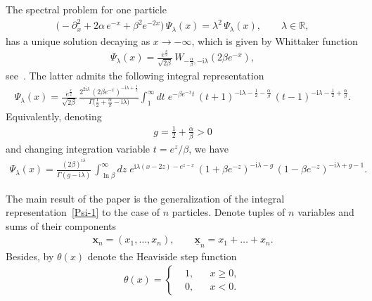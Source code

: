 \documentclass[11pt]{article}
\numberwithin{equation}{section}
\theoremstyle{plain}
\theoremstyle{definition}
\renewcommand{\imath}{\mathrm{i}}
\begin{document}
The spectral problem for one particle
\begin{align}
	\bigl( - \partial_{x}^2 + 2\alpha \, e^{-x} + \beta^2 e^{-2x} \bigr) \, \Psi_{\lambda}(x) = \lambda^2 \, \Psi_{\lambda}(x), \qquad \lambda \in \mathbb{R},
\end{align}
has a unique solution decaying as $x \to -\infty$, which is given by Whittaker function
\begin{align} \label{Psi-W}
	\Psi_{\lambda}(x) = \frac{e^{\frac{x}{2}}}{\sqrt{2\beta}} \, W_{- \frac{\alpha}{\beta}, - \imath \lambda}(2\beta e^{-x}),
\end{align}
see~\cite[\href{https://dlmf.nist.gov/13}{Chapter 13}]{DLMF}. The latter admits the following integral representation~\cite[\href{http://dlmf.nist.gov/13.16.E5}{(13.16.5)}]{DLMF}
\begin{align}
	\Psi_{\lambda}(x) = \frac{e^{\frac{x}{2}}}{\sqrt{2\beta}} \, \frac{2^{2\imath \lambda} \, (2\beta e^{-x})^{-\imath \lambda + \frac{1}{2}} }{\Gamma \bigl( \frac{1}{2} + \frac{\alpha}{\beta} - \imath \lambda \bigr)} \int_1^\infty dt \; e^{- \beta e^{-x} t}  \, (t + 1)^{-\imath \lambda - \frac{1}{2} - \frac{\alpha}{\beta}} \, (t - 1)^{-\imath \lambda - \frac{1}{2} + \frac{\alpha}{\beta}}.
\end{align}
Equivalently, denoting
\begin{align}
	g = \frac{1}{2} + \frac{\alpha}{\beta} > 0
\end{align}
and changing integration variable $t = e^{z}/\beta$, we have
\begin{align} \label{Psi-1}
	\Psi_\lambda(x) = \frac{(2\beta)^{\imath \lambda}}{\Gamma ( g - \imath \lambda )} \, \int_{\ln \beta}^\infty dz \; e^{\imath \lambda(x - 2z) - e^{z - x}} \, (1 + \beta e^{-z})^{-\imath \lambda - g} \, (1-\beta e^{-z})^{-\imath \lambda + g - 1} .
\end{align}

The main result of the paper is the generalization of the integral representation~\eqref{Psi-1} to the case of $n$ particles. Denote tuples of $n$ variables and sums of their components
\begin{align}
	\bm{x}_n = (x_1, \dots, x_n), \qquad \underline{\bm{x}}_n = x_1 + \ldots + x_n.
\end{align}
Besides, by $\theta(x)$ denote the Heaviside step function
\begin{align}
	\theta(x) = \left\{ 
	\begin{aligned}
		& 1, && x \geq 0, \\[4pt]
		& 0, && x < 0.
	\end{aligned}
	\right.
\end{align}
 
\end{document}
